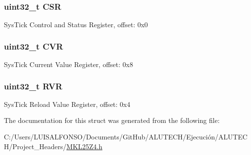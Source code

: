 \subsubsection[{C\+S\+R}]{\setlength{\rightskip}{0pt plus 5cm}uint32\+\_\+t C\+S\+R}\label{struct_sys_tick___mem_map_a9f762945117456968eec12c384b1b4e1}
Sys\+Tick Control and Status Register, offset\+: 0x0 \hypertarget{struct_sys_tick___mem_map_a9a64e88c06e0550ec009f2510db2bd58}{}
\subsubsection[{C\+V\+R}]{\setlength{\rightskip}{0pt plus 5cm}uint32\+\_\+t C\+V\+R}\label{struct_sys_tick___mem_map_a9a64e88c06e0550ec009f2510db2bd58}
Sys\+Tick Current Value Register, offset\+: 0x8 \hypertarget{struct_sys_tick___mem_map_a46baf65a2506b0376fe5d5e76576817e}{}
\subsubsection[{R\+V\+R}]{\setlength{\rightskip}{0pt plus 5cm}uint32\+\_\+t R\+V\+R}\label{struct_sys_tick___mem_map_a46baf65a2506b0376fe5d5e76576817e}
Sys\+Tick Reload Value Register, offset\+: 0x4 

The documentation for this struct was generated from the following file\+:\begin{DoxyCompactItemize}
\item 
C\+:/\+Users/\+L\+U\+I\+S\+A\+L\+F\+O\+N\+S\+O/\+Documents/\+Git\+Hub/\+A\+L\+U\+T\+E\+C\+H/\+Ejecución/\+A\+L\+U\+T\+E\+C\+H/\+Project\+\_\+\+Headers/\hyperlink{_m_k_l25_z4_8h}{M\+K\+L25\+Z4.\+h}\end{DoxyCompactItemize}
